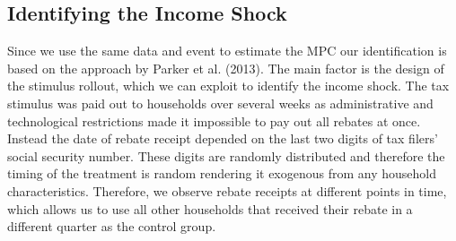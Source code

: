 \subsection{Identifying the Income Shock} \label{subsec:identification}
Since we use the same data and event to estimate the MPC our identification is based on the approach by Parker et al. (2013). The main factor is the design of the stimulus rollout, which we can exploit to identify the income shock. The tax stimulus was paid out to households over several weeks as administrative and technological restrictions made it impossible to pay out all rebates at once. Instead the date of rebate receipt depended on the last two digits of tax filers' social security number. These digits are randomly distributed and therefore the timing of the treatment is random rendering it exogenous from any household characteristics. Therefore, we observe rebate receipts at different points in time, which allows us to use all other households that received their rebate in a different quarter as the control group. \\
